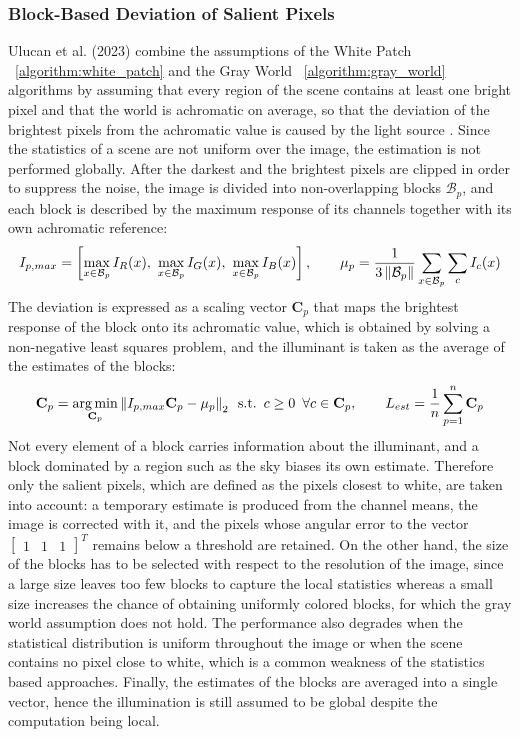 \subsubsection{Block-Based Deviation of Salient Pixels}
\label{algorithm:block_based_salient_pixels}
Ulucan et al. (2023) combine the assumptions of the White Patch ~\ref{algorithm:white_patch} and the Gray World ~\ref{algorithm:gray_world} algorithms by assuming that every region of the scene contains at least one bright pixel and that the world is achromatic on average, so that the deviation of the brightest pixels from the achromatic value is caused by the light source \cite{ulucanSalientPixels}. Since the statistics of a scene are not uniform over the image, the estimation is not performed globally. After the darkest and the brightest pixels are clipped in order to suppress the noise, the image is divided into non-overlapping blocks $\mathcal{B}_p$, and each block is described by the maximum response of its channels together with its own achromatic reference:
\begin{equation}
I_{p,max} = \left[ \max_{x \in \mathcal{B}_p} I_R(x), \,\, \max_{x \in \mathcal{B}_p} I_G(x), \,\, \max_{x \in \mathcal{B}_p} I_B(x) \right], \qquad
\mu_p = \frac{1}{3 \left\lVert\mathcal{B}_p\right\rVert} \sum_{x \in \mathcal{B}_p} \sum_{c} I_c(x)
\end{equation}
The deviation is expressed as a scaling vector $\mathbf{C}_p$ that maps the brightest response of the block onto its achromatic value, which is obtained by solving a non-negative least squares problem, and the illuminant is taken as the average of the estimates of the blocks:
\begin{equation}
\mathbf{C}_p = \underset{\mathbf{C}_p}{\arg\min} \left\lVert I_{p,max} \mathbf{C}_p - \mu_p\right\rVert_2 \,\,\, \text{s.t.} \,\,\, c \geq 0 \,\,\, \forall c \in \mathbf{C}_p, \qquad
L_{est} = \frac{1}{n} \sum_{p=1}^{n} \mathbf{C}_p
\end{equation}
Not every element of a block carries information about the illuminant, and a block dominated by a region such as the sky biases its own estimate. Therefore only the salient pixels, which are defined as the pixels closest to white, are taken into account: a temporary estimate is produced from the channel means, the image is corrected with it, and the pixels whose angular error to the vector $\begin{bmatrix} 1 & 1 & 1 \end{bmatrix}^T$ remains below a threshold are retained. On the other hand, the size of the blocks has to be selected with respect to the resolution of the image, since a large size leaves too few blocks to capture the local statistics whereas a small size increases the chance of obtaining uniformly colored blocks, for which the gray world assumption does not hold. The performance also degrades when the statistical distribution is uniform throughout the image or when the scene contains no pixel close to white, which is a common weakness of the statistics based approaches. Finally, the estimates of the blocks are averaged into a single vector, hence the illumination is still assumed to be global despite the computation being local.

